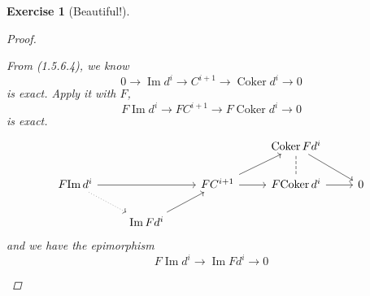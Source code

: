 \documentclass{article}
\theoremstyle{breakstyle}
\newtheorem{exercise}{Exercise}[section]
\DeclareMathOperator{\coker}{Coker}
\DeclareMathOperator{\im}{Im}
\begin{document}
\begin{exercise}[Beautiful!]
\begin{proof}
\begin{enumerate}[label=({\roman*})]
            From (1.5.6.4), we know
            $$
            0\longrightarrow \im{d^{i}}\longrightarrow C^{i+1}\longrightarrow
            \coker{d^{i}}\longrightarrow 0
            $$
            is exact. Apply it with $F$,
            $$
            F{\im{d^{i}}}\longrightarrow F{C^{i+1}}\longrightarrow
            F{\coker{d^{i}}}\longrightarrow 0
            $$
            is exact.
            $$
            \begin{tikzcd}
                                                        &                          &                                 & \coker{F{d^{i}}} \arrow[rd]                           &   \\
            F{\im{d^{i}}} \arrow[rr] \arrow[rd, dotted] &                          & F{C^{i+1}} \arrow[r] \arrow[ru] & F{\coker{d^{i}}} \arrow[u, no head, dashed] \arrow[r] & 0 \\
                                                        & \im{F{d^{i}}} \arrow[ru] &                                 &                                                       &  
            \end{tikzcd}
            $$
            and we have the epimorphism
            $$
            F{\im{d^{i}}}\longrightarrow \im{F{d^{i}}}\longrightarrow 0
            $$


\end{enumerate}
\end{proof}
\end{exercise}
\end{document}

